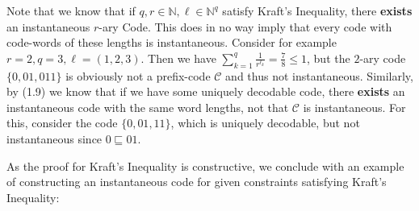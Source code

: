 \documentclass[12pt]{article}
\newenvironment{statement2}[2]{\begin{trivlist}
\item[\hskip \labelsep {\bfseries #1}\hskip \labelsep {\bfseries #2}]}{\end{trivlist}}
\begin{document}
\begin{statement2}{(1.10)}{Remark.}
    Note that we know that if $q,r \in \mathbb{N}, \ell \in \mathbb{N}^q$
    satisfy Kraft's Inequality, there \textbf{exists} an instantaneous $r$-ary Code. This does in no way imply
    that every code with code-words of these lengths is instantaneous. Consider for example
    $r = 2, q = 3, \ell = (1,2,3)$. Then we have $\sum_{k=1}^{q} \frac{1}{r^{\ell_k}} = \frac{7}{8} \leq 1$,
    but the $2$-ary code $\{0, 01, 011\}$ is obviously not a prefix-code $\mathcal{C}$ and thus not instantaneous.
    Similarly, by (1.9) we know that if we have some uniquely decodable code, there \textbf{exists} an
    instantaneous code with the same word lengths, not that $\mathcal{C}$ is instantaneous. For this,
    consider the code $\{0,01,11\}$, which is uniquely decodable, but not instantaneous since $0 \sqsubseteq 01$.
\end{statement2}

As the proof for Kraft's Inequality is constructive, we conclude with an example of constructing an instantaneous code
for given constraints satisfying Kraft's Inequality:
\end{document}
